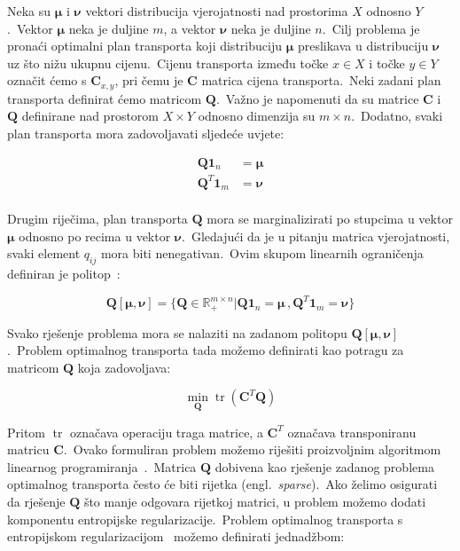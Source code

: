 \documentclass[diplomskirad]{fer}
\begin{document}
Neka su $\bm{\mu}$ i $\bm{\nu}$ vektori distribucija vjerojatnosti nad prostorima $X$ odnosno $Y$.\ Vektor $\bm{\mu}$ neka je duljine $m$, a vektor $\bm{\nu}$ neka je duljine $n$.\
Cilj problema je pronaći optimalni plan transporta koji distribuciju $\bm{\mu}$ preslikava u distribuciju $\bm{\nu}$ uz što nižu ukupnu cijenu.\ 
Cijenu transporta između točke $x \in X$ i točke $y \in Y$ označit ćemo s $\bm{C}_{x,y}$, pri čemu je $\bm{C}$ matrica cijena transporta.\ 
Neki zadani plan transporta definirat ćemo matricom $\bm{Q}$.\ Važno je napomenuti da su matrice $\bm{C}$ i $\bm{Q}$ definirane nad prostorom $X \times Y$ odnosno dimenzija su $m \times n$.\ 
Dodatno, svaki plan transporta mora zadovoljavati sljedeće uvjete:

\begin{equation}
  \begin{aligned}
    \bm{Q} \bm{1}_n &= \bm{\mu} \\
    \bm{Q}^T \bm{1}_m &= \bm{\nu} \\
  \end{aligned}
  \label{eq:ot_plan_conds}
\end{equation}

Drugim riječima, plan transporta $\bm{Q}$ mora se marginalizirati po stupcima u vektor $\bm{\mu}$ odnosno po recima u vektor $\bm{\nu}$.\ Gledajući da je u pitanju matrica vjerojatnosti, svaki element $q_{ij}$ mora biti nenegativan.\ 
Ovim skupom linearnih ograničenja definiran je politop~\cite{ziegler1993lectures}:

\begin{equation}
  \bm{Q}\left[ \bm{\mu}, \bm{\nu} \right] = \{ \bm{Q} \in \mathbb{R}_{+}^{m \times n} | \bm{Q} \bm{1}_n = \bm{\mu}\,, \bm{Q}^T \bm{1}_m = \bm{\nu} \}
  \label{eq:ot_polytope}
\end{equation}

Svako rješenje problema mora se nalaziti na zadanom politopu $\bm{Q}\left[ \bm{\mu}, \bm{\nu} \right]$.\ Problem optimalnog transporta tada možemo definirati kao potragu za matricom $\bm{Q}$ koja zadovoljava:

\begin{equation}
  \min_{\bm{Q}} \operatorname{tr}(\bm{C}^T \bm{Q})
  \label{eq:ot_basic}
\end{equation}

Pritom $\operatorname{tr}$ označava operaciju traga matrice, a $\bm{C}^T$ označava transponiranu matricu $\bm{C}$.\ Ovako formuliran problem možemo riješiti proizvoljnim algoritmom linearnog programiranja~\cite{dantzig2002linear}.\ 
Matrica $\bm{Q}$ dobivena kao rješenje zadanog problema optimalnog transporta često će biti rijetka (engl.\ \textit{sparse}).\ 
Ako želimo osigurati da rješenje $\bm{Q}$ što manje odgovara rijetkoj matrici, u problem možemo dodati komponentu entropijske regularizacije.\ 
Problem optimalnog transporta s entropijskom regularizacijom~\cite{genevay2019entropy} možemo definirati jednadžbom:
\end{document}

